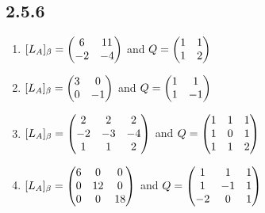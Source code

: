 \documentclass[12pt,titlepage]{extarticle}
\begin{document}
\subsection*{2.5.6}
\begin{enumerate}
    \item $[L_A]_{\beta} = \mqty(6 & 11 \\ -2 & -4 \\)$ and $Q = \mqty(1 & 1 \\ 1 & 2)$
    \item $[L_A]_{\beta} = \mqty(3 & 0 \\ 0 & -1)$ and $Q = \mqty(1 & 1 \\ 1 & -1)$
    \item $[L_A]_{\beta} = \mqty(2 & 2 & 2 \\ -2 & -3 & -4 \\ 1 & 1 & 2)$ and $Q = \mqty(1 & 1 & 1 \\ 1 & 0 & 1 \\ 1 & 1 & 2)$
    \item $[L_A]_{\beta} = \mqty(6 & 0 & 0 \\ 0 & 12 & 0 \\ 0 & 0 & 18)$ and $Q = \mqty(1 & 1 & 1 \\ 1 & -1 & 1 \\ -2 & 0 & 1)$
\end{enumerate}
\end{document}
